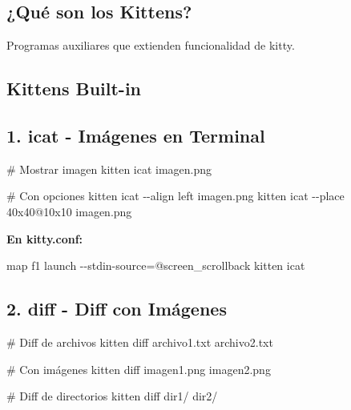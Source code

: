 \documentclass[
  doc,
  floatsintext,
  longtable,
  a4paper,
  nolmodern,
  notxfonts,
  notimes,
  12pt,
  colorlinks=true,linkcolor=blue,citecolor=blue,urlcolor=blue]{apa7}
\newenvironment{Shaded}{\begin{snugshade}}{\end{snugshade}}
\newcommand{\AttributeTok}[1]{\textcolor[rgb]{0.40,0.45,0.13}{#1}}
\newcommand{\CommentTok}[1]{\textcolor[rgb]{0.37,0.37,0.37}{#1}}
\newcommand{\DataTypeTok}[1]{\textcolor[rgb]{0.68,0.00,0.00}{#1}}
\newcommand{\ErrorTok}[1]{\textcolor[rgb]{0.68,0.00,0.00}{#1}}
\newcommand{\ExtensionTok}[1]{\textcolor[rgb]{0.00,0.23,0.31}{#1}}
\newcommand{\NormalTok}[1]{\textcolor[rgb]{0.00,0.23,0.31}{#1}}
\newcommand{\OperatorTok}[1]{\textcolor[rgb]{0.37,0.37,0.37}{#1}}
\begin{document}
\subsection{¿Qué son los Kittens?}\label{quuxe9-son-los-kittens}

Programas auxiliares que extienden funcionalidad de kitty.

\subsection{Kittens Built-in}\label{kittens-built-in}

\subsection{1. icat - Imágenes en
Terminal}\label{icat---imuxe1genes-en-terminal}

\begin{Shaded}
\begin{Highlighting}[]
\CommentTok{\# Mostrar imagen}
\ExtensionTok{kitten}\NormalTok{ icat imagen.png}

\CommentTok{\# Con opciones}
\ExtensionTok{kitten}\NormalTok{ icat }\AttributeTok{{-}{-}align}\NormalTok{ left imagen.png}
\ExtensionTok{kitten}\NormalTok{ icat }\AttributeTok{{-}{-}place}\NormalTok{ 40x40@10x10 imagen.png}
\end{Highlighting}
\end{Shaded}

\textbf{En kitty.conf:}

\begin{Shaded}
\begin{Highlighting}[]
\DataTypeTok{map} \DataTypeTok{f1} \DataTypeTok{launch} \DataTypeTok{{-}{-}stdin{-}source}\OperatorTok{=}\ErrorTok{@}\DataTypeTok{screen\_scrollback} \DataTypeTok{kitten} \DataTypeTok{icat}
\end{Highlighting}
\end{Shaded}

\subsection{2. diff - Diff con
Imágenes}\label{diff---diff-con-imuxe1genes}

\begin{Shaded}
\begin{Highlighting}[]
\CommentTok{\# Diff de archivos}
\ExtensionTok{kitten}\NormalTok{ diff archivo1.txt archivo2.txt}

\CommentTok{\# Con imágenes}
\ExtensionTok{kitten}\NormalTok{ diff imagen1.png imagen2.png}

\CommentTok{\# Diff de directorios}
\ExtensionTok{kitten}\NormalTok{ diff dir1/ dir2/}
\end{Highlighting}
\end{Shaded}
\end{document}
